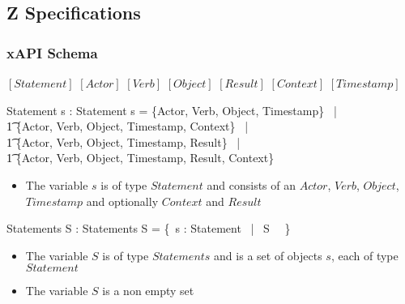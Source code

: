 \documentclass{article}
\begin{document}
  \subsection{Z Specifications}
  \subsubsection{xAPI Schema}
  $[Statement]$
  $[Actor]$
  $[Verb]$
  $[Object]$
  $[Result]$
  $[Context]$
  $[Timestamp]$
  \begin{schema}{Statement}
    s : Statement
    \where
    s = \{Actor, Verb, Object, Timestamp\} \, |
    \\ \t1 \{Actor, Verb, Object, Timestamp, Context\} \, |
    \\ \t1 \{Actor, Verb, Object, Timestamp, Result\} \, |
    \\ \t1 \{Actor, Verb, Object, Timestamp, Result, Context\}
  \end{schema}
  \begin{itemize}
  \item The variable $s$ is of type $Statement$ and consists of an $Actor$, $Verb$, $Object$, $Timestamp$ and optionally $Context$ and $Result$
  \end{itemize}
  \begin{schema}{Statements}
    S : Statements
    \where
    S = \{~s : Statement \, | \, S \, \neg \, \emptyset\} \\
  \end{schema}
  \begin{itemize}
  \item The variable $S$ is of type $Statements$ and is a set of objects $s$, each of type $Statement$
 \item The variable $S$ is a non empty set
  \end{itemize}
\end{document}
